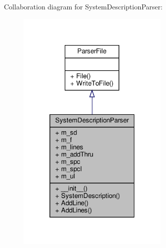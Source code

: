 Collaboration diagram for System\+Description\+Parser\+:\nopagebreak
\begin{figure}[H]
\begin{center}
\leavevmode
\includegraphics[width=208pt]{classSignalIntegrity_1_1Parsers_1_1SystemDescriptionParser_1_1SystemDescriptionParser__coll__graph}
\end{center}
\end{figure}
